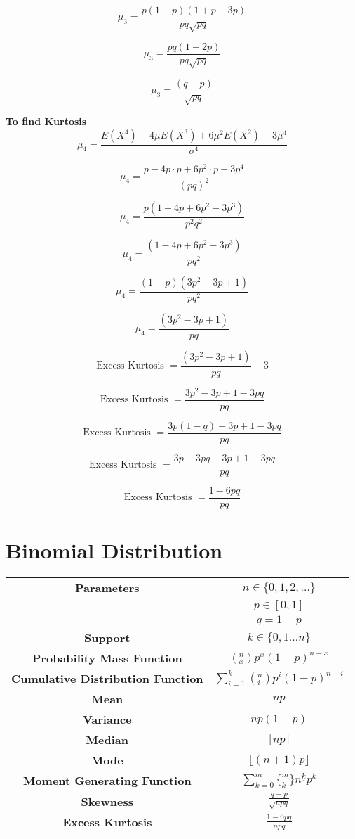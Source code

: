\documentclass[14pt, a4paper]{article}
\theoremstyle{definition}
\begin{document}
\[\mu_3 = \frac{p (1 - p)(1+p - 3p)}{pq \sqrt{pq}}\] 

\[\mu_3 = \frac{p q(1 - 2p)}{pq \sqrt{pq}}\] 

\[\mu_3 = \frac{(q - p)}{\sqrt{pq}}\]


\textbf{To find Kurtosis}
\[ \mu_4 = \frac{ E(X^4) - 4 \mu E(X^3) + 6 \mu^2 E(X^2) - 3 \mu^4}{ \sigma^4} \]

\[\mu_4 = \frac{p - 4p \cdot p + 6p^2 \cdot p - 3 p^4}{(pq)^2}\]

\[\mu_4 = \frac{p(1-4p+6p^2 - 3p^3)}{p^2q^2}\]

\[\mu_4 = \frac{(1-4p+6p^2 - 3p^3)}{pq^2}\]

\[\mu_4 = \frac{(1-p)(3p^2 - 3p +1)}{pq^2}\]

\[\mu_4 = \frac{(3p^2 - 3p +1)}{pq}\]

\[\text{Excess Kurtosis } = \frac{(3p^2 - 3p +1)}{pq} - 3\]

\[\text{Excess Kurtosis } = \frac{3p^2 - 3p +1 - 3 pq}{pq}\]

\[\text{Excess Kurtosis } = \frac{3p(1- q) - 3p +1 - 3 pq}{pq}\]

\[\text{Excess Kurtosis } = \frac{3p- 3pq - 3p +1 - 3 pq}{pq}\]

\[\text{Excess Kurtosis } = \frac{1 - 6 pq}{pq}\]


\section{Binomial Distribution}

\begin{tabular}{|c|c|}  %
\hline
 \textbf{Parameters }& $n \in \{0,1,2, \dots \}$ \\ & $p \in [0,1]$ \\ & $q = 1-p$  \\
 \hline
 \textbf{Support} & $k \in \{ 0,1 \dots n \} $ \\
 \hline
 \textbf{Probability Mass Function} & 
 $ (^n_x)p^x(1-p)^{n-x}$
 \\
 \hline
 \textbf{Cumulative Distribution Function} &
 $\sum^k_{i=1}(^n_i)p^i(1-p)^{n-i}$ \\
 \hline
 \textbf{Mean} & $np$ \\ 
 \hline
 \textbf{Variance} & $np(1-p)$ \\
 \hline
 \textbf{Median} & $\lfloor np \rfloor $ \\ 
 \hline
 \textbf{Mode} & $\lfloor (n+1)p \rfloor $ \\
 \hline
 \textbf{Moment Generating Function} & $\sum^m_{k=0} \{ ^m_k\} n^{\underline{k}} p^k$ \\
 \hline
 \textbf{Skewness} & $\frac{q-p}{\sqrt{npq}}$ \\
 \hline
 \textbf{Excess Kurtosis} & $\frac{1-6pq}{npq}$  \\
 \hline
       
  \end{tabular}
  
\end{document}
